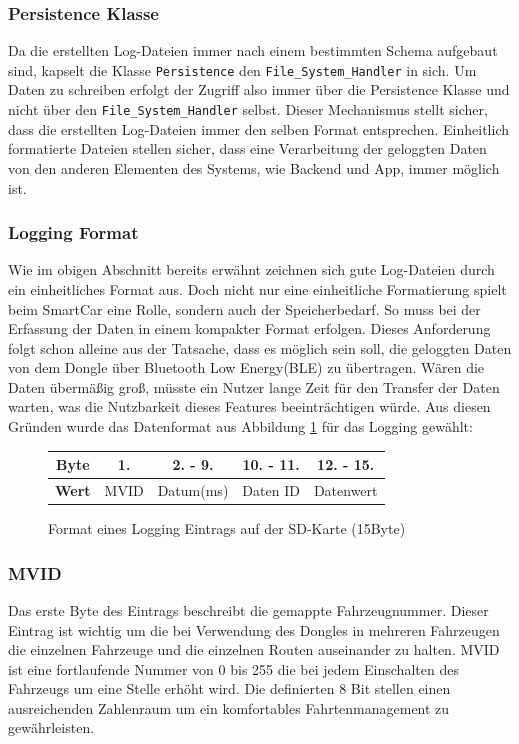 \subsubsection*{Persistence Klasse}
Da die erstellten Log-Dateien immer nach einem bestimmten Schema aufgebaut sind, kapselt die Klasse \texttt{Persistence} den \texttt{File\_System\_Handler} in sich. Um Daten zu schreiben erfolgt der Zugriff also immer über die Persistence Klasse und nicht über den \texttt{File\_System\_Handler} selbst. Dieser Mechanismus stellt sicher, dass die erstellten Log-Dateien immer den selben Format entsprechen. Einheitlich formatierte Dateien stellen sicher, dass eine Verarbeitung der geloggten Daten von den anderen Elementen des Systems, wie Backend und App, immer möglich ist.
\subsubsection*{Logging Format}
Wie im obigen Abschnitt bereits erwähnt zeichnen sich gute Log-Dateien durch ein einheitliches Format aus. Doch nicht nur eine einheitliche Formatierung spielt beim SmartCar eine Rolle, sondern auch der Speicherbedarf. So muss bei der Erfassung der Daten in einem kompakter Format erfolgen. Dieses Anforderung folgt schon alleine aus der Tatsache, dass es möglich sein soll, die geloggten Daten von dem Dongle über Bluetooth Low Energy(BLE) zu übertragen. Wären die Daten übermäßig groß, müsste ein Nutzer lange Zeit für den Transfer der Daten warten, was die Nutzbarkeit dieses Features beeinträchtigen würde. Aus diesen Gründen wurde das Datenformat aus Abbildung \ref{fig:LoggingEntry} für das Logging gewählt:
\begin{figure}[h]
\begin{center}
  \begin{tabular}{ | c || c | c | c | c |}
    \hline
    \textbf{Byte} & 1. & 2. - 9. & 10. - 11. & 12. - 15. \\ \hline
    \textbf{Wert} & MVID & Datum(ms) & Daten ID & Datenwert \\
    \hline
  \end{tabular}
  \caption{Format eines Logging Eintrags auf der SD-Karte (15Byte)}
  \label{fig:LoggingEntry}
\end{center}
\end{figure}
\subsubsection*{MVID}
Das erste Byte des Eintrags beschreibt die gemappte Fahrzeugnummer. Dieser Eintrag ist wichtig um die bei Verwendung des Dongles in mehreren Fahrzeugen die einzelnen Fahrzeuge und die einzelnen Routen auseinander zu halten. MVID ist eine fortlaufende Nummer von 0 bis 255 die bei jedem Einschalten des Fahrzeugs um eine Stelle erhöht wird. Die definierten 8 Bit stellen einen ausreichenden Zahlenraum um ein komfortables Fahrtenmanagement zu gewährleisten. 
